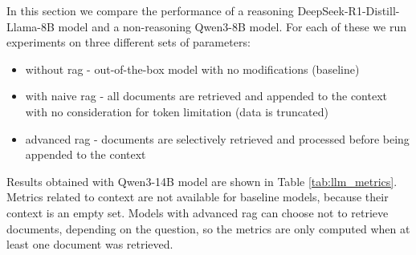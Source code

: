 \documentclass[fleqn,moreauthors,10pt]{ds_report}
\begin{document}
\begin{table}[t]
{}
\caption{Performance comparison as evaluated by GPT-4.1-mini model with DeepEval framework.}
\label{tab:gpt}
\end{table}

In this section we compare the performance of a reasoning DeepSeek-R1-Distill-Llama-8B \cite{deepseek3} model and a non-reasoning Qwen3-8B \cite{qwen3} model. For each of these we run experiments on three different sets of parameters:
\begin{itemize}
	\item without \ac{rag} - out-of-the-box model with no modifications (baseline)
	\item with naive \ac{rag} - all documents are retrieved and appended to the context with no consideration for token limitation (data is truncated)
	\item advanced \ac{rag} - documents are selectively retrieved and processed before being appended to the context
\end{itemize}

Results obtained with Qwen3-14B model are shown in Table \ref{tab:llm_metrics}. Metrics related to context are not available for baseline models, because their context is an empty set. Models with advanced \ac{rag} can choose not to retrieve documents, depending on the question, so the metrics are only computed when at least one document was retrieved. 
\end{document}

